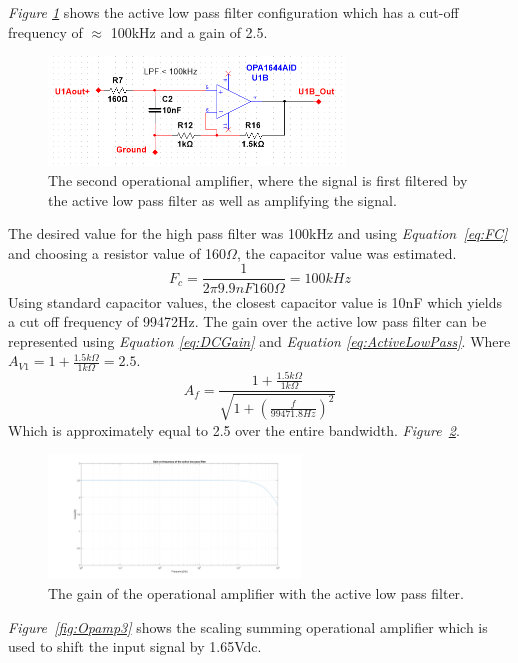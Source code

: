 \textit{Figure \ref{fig:Opamp2}} shows the active low pass filter configuration which has a cut-off frequency of $\approx$ 100kHz and a gain of 2.5.

\begin{figure}[h]
    \centering
    \includegraphics[width=0.7\textwidth]{graphics/OPamp2.png}
    \caption{The second operational amplifier, where the signal is first filtered by the active low pass filter as well as amplifying the signal.}
    \label{fig:Opamp2}
\end{figure}

The desired value for the high pass filter was 100kHz and using \textit{Equation~\ref{eq:FC}} and choosing a resistor value of 160$\Omega$, the capacitor value was estimated.   
$$F_c = \frac{1}{2\pi 9.9nF 160\Omega} = 100kHz$$
Using standard capacitor values, the closest capacitor value is 10nF which yields a cut off frequency of 99472Hz.
The gain over the active low pass filter can be represented using \textit{Equation \ref{eq:DCGain}} and \textit{Equation \ref{eq:ActiveLowPass}}. 
Where $A_{V1} = 1 + \frac{1.5k\Omega}{1k\Omega} = 2.5$.
$$A_f  = \frac{1 + \frac{1.5k\Omega}{1k\Omega}}{\sqrt{1 + (\frac{f}{99471.8Hz})^2}}$$
Which is approximately equal to 2.5 over the entire bandwidth. 
\textit{Figure~\ref{fig:AVlowpass}}.

\begin{figure}[h]
    \centering
    \includegraphics[width=0.6\textwidth]{graphics/Av_Lowpass.png}
    \caption{The gain of the operational amplifier with the active low pass filter.}
    \label{fig:AVlowpass}
\end{figure}

\textit{Figure~\ref{fig:Opamp3}} shows the scaling summing operational amplifier which is used to shift the input signal by 1.65Vdc. 


